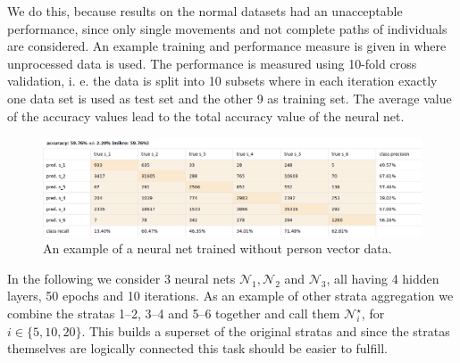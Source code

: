\documentclass[runningheads]{llncs}
\begin{document}
	We do this, because results on the normal datasets had an unacceptable performance, since only single movements and not complete paths of individuals are considered. An example training and performance measure is given in  where unprocessed data is used. The performance is measured using 10-fold cross validation, i. e. the data is split into 10 subsets where in each iteration exactly one data set is used as test set and the other 9 as training set. The average value of the accuracy values lead
	 to the total accuracy value of the neural net.
	\begin{figure}[H]
		\centering
		\includegraphics[scale = 0.4]{src/pic/NN_without_vector.png}
		\caption{An example of a neural net trained without person vector data.}
		\label{fig: NN without vector}
	\end{figure}
	
	In the following we consider 3 neural nets $\mathcal{N}_1,\mathcal{N}_2$ and $\mathcal{N}_3$, all having 4 hidden layers, 50 epochs and 10 iterations.	
	As an example of other strata aggregation we combine the stratas 1--2, 3--4 and 5--6 together and call them $\mathcal{N}_i^\star$, for $i \in \{5,10,20\}$. This builds a superset of the original stratas and since the stratas themselves are logically connected this task should be easier to fulfill.\\
	
\end{document}
